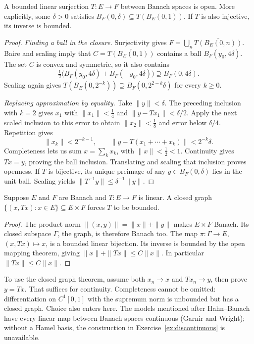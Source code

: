 \begin{theorem}\label{thm:openmapping}
A bounded linear surjection $T:E\to F$ between Banach spaces is open. More explicitly, some $\delta>0$ satisfies $B_F(0,\delta)\subseteq T(B_E(0,1))$. If $T$ is also injective, its inverse is bounded.
\end{theorem}
\begin{proof}
\emph{Finding a ball in the closure.} Surjectivity gives $F=\bigcup_n\overline{T(B_E(0,n))}$. Baire and scaling imply that $C=\overline{T(B_E(0,1))}$ contains a ball $B_F(y_0,4\delta)$. The set $C$ is convex and symmetric, so it also contains
\[\tfrac12\bigl(B_F(y_0,4\delta)+B_F(-y_0,4\delta)\bigr)\supseteq B_F(0,4\delta).\]
Scaling again gives $\overline{T(B_E(0,2^{-k}))}\supseteq B_F(0,2^{2-k}\delta)$ for every $k\ge0$.

\emph{Replacing approximation by equality.} Take $\|y\|<\delta$. The preceding inclusion with $k=2$ gives $x_1$ with $\|x_1\|<\frac14$ and $\|y-Tx_1\|<\delta/2$. Apply the next scaled inclusion to this error to obtain $\|x_2\|<\frac18$ and error below $\delta/4$. Repetition gives
\[\|x_k\|<2^{-k-1},\qquad\|y-T(x_1+\cdots+x_k)\|<2^{-k}\delta.\]
Completeness lets us sum $x=\sum_kx_k$, with $\|x\|<\frac12<1$. Continuity gives $Tx=y$, proving the ball inclusion. Translating and scaling that inclusion proves openness. If $T$ is bijective, its unique preimage of any $y\in B_F(0,\delta)$ lies in the unit ball. Scaling yields $\|T^{-1}y\|\le\delta^{-1}\|y\|$.
\end{proof}

\begin{theorem}\label{thm:closedgraph}
Suppose $E$ and $F$ are Banach and $T:E\to F$ is linear. A closed graph $\{(x,Tx):x\in E\}\subseteq E\times F$ forces $T$ to be bounded.
\end{theorem}
\begin{proof}
The product norm $\|(x,y)\|=\|x\|+\|y\|$ makes $E\times F$ Banach. Its closed subspace $\Gamma$, the graph, is therefore Banach too. The map $\pi:\Gamma\to E$, $(x,Tx)\mapsto x$, is a bounded linear bijection. Its inverse is bounded by the open mapping theorem, giving $\|x\|+\|Tx\|\le C\|x\|$. In particular $\|Tx\|\le C\|x\|$.
\end{proof}

To use the closed graph theorem, assume both $x_n\to x$ and $Tx_n\to y$, then prove $y=Tx$. That suffices for continuity. Completeness cannot be omitted: differentiation on $C^1[0,1]$ with the supremum norm is unbounded but has a closed graph. Choice also enters here. The models mentioned after Hahn--Banach have every linear map between Banach spaces continuous (Garnir and Wright); without a Hamel basis, the construction in Exercise~\ref{ex:discontinuous} is unavailable.

